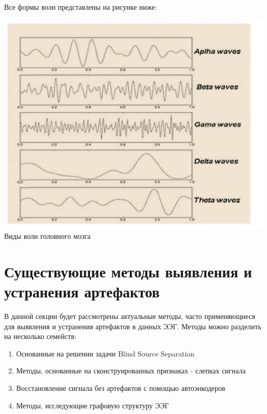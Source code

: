 \documentclass[12pt, a4paper, titlepage]{extreport}
\begin{document}
	Все формы волн представлены на рисунке ниже:\\
		\begin{center}
		\includegraphics[scale=0.8]{waveforms}\\
		Виды волн головного мозга \cite{41}
	\end{center}
	\section*{Существующие методы выявления и устранения артефактов}
	В данной секции будет рассмотрены актуальные методы, часто применяющиеся для выявления и устранения артефактов в данных ЭЭГ. Методы можно разделить на несколько семейств:
	\begin{enumerate}
		\item Основанные на решении задачи Blind Source Separation
		\item Методы, основанные на сконструированных признаках - слепках сигнала
		\item Восстановление сигнала без артефактов с помощью автоэнкодеров
		\item Методы, исследующие графовую структуру ЭЭГ
	\end{enumerate}
\end{document}
